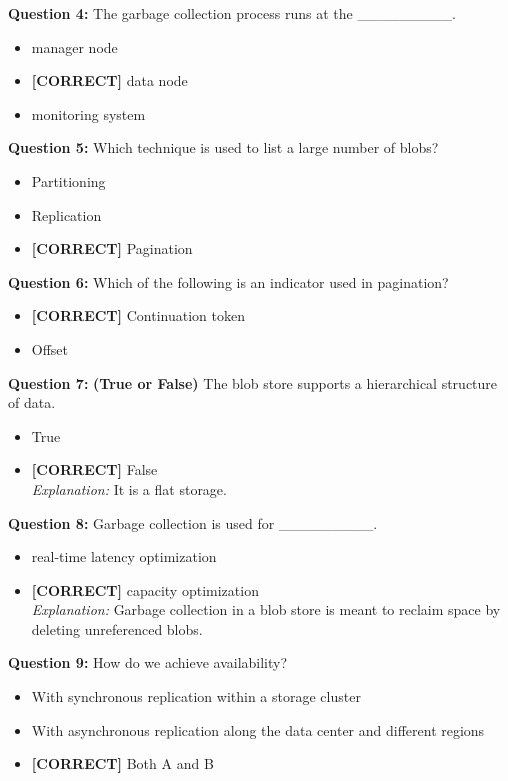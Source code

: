 \vspace{0.3cm}
\noindent
\textbf{Question 4:} The garbage collection process runs at the \_\_\_\_\_\_\_\_\_.
\\[0.2cm]
\begin{itemize}
 \item manager node
 \item \textbf{[CORRECT]} data node
 \item monitoring system
\end{itemize}
\vspace{0.3cm}
\noindent
\textbf{Question 5:} Which technique is used to list a large number of blobs?
\\[0.2cm]
\begin{itemize}
 \item Partitioning
 \item Replication
 \item \textbf{[CORRECT]} Pagination
\end{itemize}
\vspace{0.3cm}
\noindent
\textbf{Question 6:} Which of the following is an indicator used in pagination?
\\[0.2cm]
\begin{itemize}
 \item \textbf{[CORRECT]} Continuation token
 \item Offset
\end{itemize}
\vspace{0.3cm}
\noindent
\textbf{Question 7:} \textbf{(True or False)} The blob store supports a hierarchical structure of data.
\\[0.2cm]
\begin{itemize}
 \item True
 \item \textbf{[CORRECT]} False
\\[0.1cm]
\textit{Explanation:} 
It is a flat storage.
\end{itemize}
\vspace{0.3cm}
\noindent
\textbf{Question 8:} Garbage collection is used for \_\_\_\_\_\_\_\_\_.
\\[0.2cm]
\begin{itemize}
 \item real-time latency optimization
 \item \textbf{[CORRECT]} capacity optimization
\\[0.1cm]
\textit{Explanation:} 
Garbage collection in a blob store is meant to reclaim space by deleting unreferenced blobs.
\end{itemize}
\vspace{0.3cm}
\noindent
\textbf{Question 9:} How do we achieve availability?
\\[0.2cm]
\begin{itemize}
 \item With synchronous replication within a storage cluster
 \item With asynchronous replication along the data center and different regions
 \item \textbf{[CORRECT]} Both A and B
\end{itemize}



